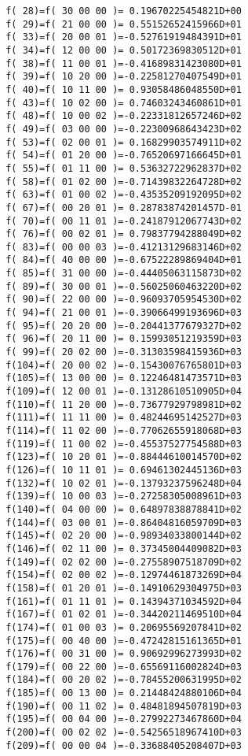 {\begin{verbatim}
 f( 28)=f( 30 00 00 )= 0.19670225454821D+00
 f( 29)=f( 21 00 00 )= 0.55152652415966D+01
 f( 33)=f( 20 00 01 )=-0.52761919484391D+01
 f( 34)=f( 12 00 00 )= 0.50172369830512D+01
 f( 38)=f( 11 00 01 )=-0.41689831423080D+01
 f( 39)=f( 10 20 00 )=-0.22581270407549D+01
 f( 40)=f( 10 11 00 )= 0.93058486048550D+01
 f( 43)=f( 10 02 00 )= 0.74603243460861D+01
 f( 48)=f( 10 00 02 )=-0.22331812657246D+02
 f( 49)=f( 03 00 00 )=-0.22300968643423D+02
 f( 53)=f( 02 00 01 )= 0.16829903574911D+02
 f( 54)=f( 01 20 00 )=-0.76520697166645D+01
 f( 55)=f( 01 11 00 )= 0.53632722962837D+02
 f( 58)=f( 01 02 00 )=-0.71439832264728D+02
 f( 63)=f( 01 00 02 )=-0.43535209192095D+02
 f( 67)=f( 00 20 01 )= 0.28783874201457D-01
 f( 70)=f( 00 11 01 )=-0.24187912067743D+02
 f( 76)=f( 00 02 01 )= 0.79837794288049D+02
 f( 83)=f( 00 00 03 )=-0.41213129683146D+02
 f( 84)=f( 40 00 00 )=-0.67522289869404D+01
 f( 85)=f( 31 00 00 )=-0.44405063115873D+02
 f( 89)=f( 30 00 01 )=-0.56025060463220D+02
 f( 90)=f( 22 00 00 )=-0.96093705954530D+02
 f( 94)=f( 21 00 01 )=-0.39066499193696D+03
 f( 95)=f( 20 20 00 )=-0.20441377679327D+02
 f( 96)=f( 20 11 00 )= 0.15993051219359D+03
 f( 99)=f( 20 02 00 )=-0.31303598415936D+03
 f(104)=f( 20 00 02 )=-0.15430076765801D+03
 f(105)=f( 13 00 00 )= 0.12246481473571D+03
 f(109)=f( 12 00 01 )=-0.13128610510905D+04
 f(110)=f( 11 20 00 )=-0.73677929798981D+02
 f(111)=f( 11 11 00 )= 0.48244695142527D+03
 f(114)=f( 11 02 00 )=-0.77062655918068D+03
 f(119)=f( 11 00 02 )=-0.45537527754588D+03
 f(123)=f( 10 20 01 )=-0.88444610014570D+02
 f(126)=f( 10 11 01 )= 0.69461302445136D+03
 f(132)=f( 10 02 01 )=-0.13793237596248D+04
 f(139)=f( 10 00 03 )=-0.27258305008961D+03
 f(140)=f( 04 00 00 )= 0.64897838878841D+02
 f(144)=f( 03 00 01 )=-0.86404816059709D+03
 f(145)=f( 02 20 00 )=-0.98934033800144D+02
 f(146)=f( 02 11 00 )= 0.37345004409082D+03
 f(149)=f( 02 02 00 )=-0.27558907518709D+02
 f(154)=f( 02 00 02 )=-0.12974461873269D+04
 f(158)=f( 01 20 01 )=-0.14910629304975D+03
 f(161)=f( 01 11 01 )= 0.14394371034592D+04
 f(167)=f( 01 02 01 )=-0.34420211469510D+04
 f(174)=f( 01 00 03 )= 0.20695569207841D+02
 f(175)=f( 00 40 00 )=-0.47242815161365D+01
 f(176)=f( 00 31 00 )= 0.90692996273993D+02
 f(179)=f( 00 22 00 )=-0.65569116002824D+03
 f(184)=f( 00 20 02 )=-0.78455200631995D+02
 f(185)=f( 00 13 00 )= 0.21448424880106D+04
 f(190)=f( 00 11 02 )= 0.48481894507819D+03
 f(195)=f( 00 04 00 )=-0.27992273467860D+04
 f(200)=f( 00 02 02 )=-0.54256518967410D+03
 f(209)=f( 00 00 04 )=-0.33688405208407D+03
\end{verbatim}}


